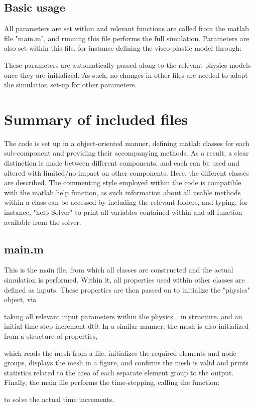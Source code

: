 \documentclass[3p]{elsarticle} %
\begin{document}
\subsection{Basic usage}
All parameters are set within and relevant functions are called from the matlab file "main.m", and running this file performs the full simulation. Parameters are also set within this file, for instance defining the visco-plastic model through:

These parameters are automatically passed along to the relevant physics models once they are initialized. As such, no changes in other files are needed to adapt the simulation set-up for other parameters. 

\section{Summary of included files}
The code is set up in a object-oriented manner, defining matlab classes for each sub-component and providing their accompanying methods. As a result, a clear distinction is made between different components, and each can be used and altered with limited/no impact on other components. Here, the different classes are described. The commenting style employed within the code is compatible with the matlab help function, as such information about all usable methods within a class can be accessed by including the relevant folders, and typing, for instance, "help Solver" to print all variables contained within and all function available from the solver. 

\subsection{main.m}
This is the main file, from which all classes are constructed and the actual simulation is performed. Within it, all properties used within other classes are defined as inputs. These properties are then passed on to initialize the "physics" object, via 

taking all relevant input parameters within the physics\_ in structure, and an initial time step increment dt0. In a similar manner, the mesh is also initialized from a structure of properties, 

which reads the mesh from a file, initializes the required elements and node groups, displays the mesh in  a figure, and confirms the mesh is valid and prints statistics related to the area of each separate element group to the output. Finally, the main file performs the time-stepping, calling the function:

to solve the actual time increments. 
\end{document}
